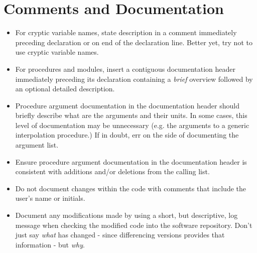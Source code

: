 \section{Comments and Documentation}
\begin{itemize}
  \item For cryptic variable names, state description in a comment immediately preceding declaration or on end of the declaration line. Better yet, try not to use cryptic variable names.
  \item For procedures and modules, insert a contiguous documentation header immediately preceding its declaration containing a \emph{brief} overview followed by an optional detailed description.
  \item Procedure argument documentation in the documentation header should briefly describe what are the arguments and their units. In some cases, this level of documentation may be unnecessary (e.g. the arguments to a generic interpolation procedure.) If in doubt, err on the side of documenting the argument list.
  \item Ensure procedure argument documentation in the documentation header is consistent with additions and/or deletions from the calling list.
  \item Do not document changes within the code with comments that include the user's name or initials.
  \item Document any modifications made by using a short, but descriptive, log message when checking the modified code into the software repository. Don't just say \emph{what} has changed - since differencing versions provides that information - but \emph{why}.
\end{itemize}


